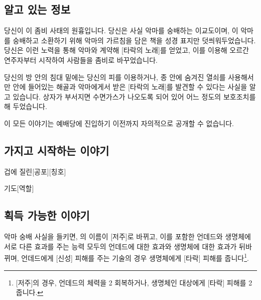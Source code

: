 \documentclass{report}
\begin{document}
	\subsection*{알고 있는 정보}
		당신이 이 좀비 사태의 원흉입니다. 당신은 사실 악마를 숭배하는 이교도이며, 이 악마를 숭배하고 소환하기 위해 악마의 가르침을 담은 책을 성경 표지만 덧씌워두었습니다. 당신은 이런 노력을 통해 악마와 계약해 [타락의 노래]를 얻었고, 이를 이용해 오르간 연주자부터 시작하여 사람들을 좀비로 바꾸었습니다.
		
		당신의 방 안의 침대 밑에는 당신의 피를 이용하거나, 종 안에 숨겨진 열쇠를 사용해서만 안에 들어있는 해골과 악마에게서 받은 [타락의 노래]를 발견할 수 있다는 사실을 알고 있습니다. 상자가 부서지면 수면가스가 나오도록 되어 있어 어느 정도의 보호조치를 해 두었습니다.
		
		이 모든 이야기는 예배당에 진입하기 이전까지 자의적으로 공개할 수 없습니다.
	
	\subsection*{가지고 시작하는 이야기}
		\begin{spoiler}{겁에 질린}{[공포][칭호]}
			
			

		\end{spoiler}
		
		\begin{spoiler}{기도}{[역할]}
		\end{spoiler}
	
	\subsection*{획득 가능한 이야기}
	악마 숭배 사실을 들키면, 의 이름이 [저주]로 바뀌고, 이를 포함한 언데드와 생명체에 서로 다른 효과를 주는 능력 모두의 언데드에 대한 효과와 생명체에 대한 효과가 뒤바뀌며, 언데드에게 [신성] 피해를 주는 기술의 경우 생명체에게 [타락] 피해를 줍니다\footnote{[저주]의 경우, 언데드의 체력을 2 회복하거나, 생명체인 대상에게 [타락] 피해를 2 줍니다.}.
	
\end{document}
